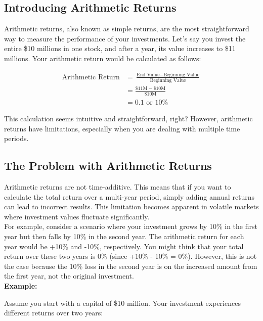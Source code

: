 \documentclass{article}
\begin{document}
\subsection{Introducing Arithmetic Returns}

Arithmetic returns, also known as simple returns, are the most straightforward way to measure the performance of your investments. Let's say you invest the entire \$10 millions in one stock, and after a year, its value increases to \$11 millions. Your arithmetic return would be calculated as follows:

\begin{align*}
    \text{Arithmetic Return} &= \frac{\text{End Value} - \text{Beginning Value}}{\text{Beginning Value}} \\
                             &= \frac{\$11\text{M} - \$10\text{M}}{\$10\text{M}} \\
                             &= 0.1 \text{ or } 10\%
\end{align*}

This calculation seems intuitive and straightforward, right? However, arithmetic returns have limitations, especially when you are dealing with multiple time periods.

\subsection{The Problem with Arithmetic Returns}

Arithmetic returns are not time-additive. This means that if you want to calculate the total return over a multi-year period, simply adding annual returns can lead to incorrect results. This limitation becomes apparent in volatile markets where investment values fluctuate significantly. \\

For example, consider a scenario where your investment grows by 10\% in the first year but then falls by 10\% in the second year. The arithmetic return for each year would be +10\% and -10\%, respectively. You might think that your total return over these two years is 0\% (since +10\% - 10\% = 0\%). However, this is not the case because the 10\% loss in the second year is on the increased amount from the first year, not the original investment. \\

\textbf{Example:}

Assume you start with a capital of \$10 million. Your investment experiences different returns over two years:
\end{document}

